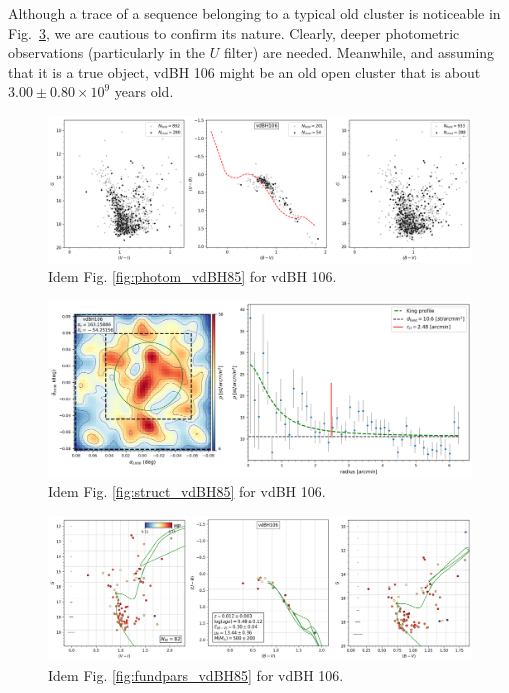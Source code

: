 \documentclass[draft]{aa}
\begin{document}
Although a trace of a sequence belonging to a typical old cluster is
noticeable in Fig.~\ref{fig45}, we are cautious to confirm its nature.
Clearly, deeper photometric observations (particularly in the $U$ filter) are
needed. Meanwhile, and assuming that it is a true object,
vdBH 106 might be an old open cluster that is about $3.00\pm0.80\times10^9$ years
old.

\begin{figure}[ht]
    \centering
    \includegraphics[width=\hsize]{../figs/obs_vdBH106.png}
    \caption{Idem Fig. \ref{fig:photom_vdBH85} for vdBH 106.}
    \label{fig43}
\end{figure}
\begin{figure}[ht]
    \centering
    \includegraphics[width=\hsize]{../figs/dmap_vdbh106.png}
    \caption{Idem Fig. \ref{fig:struct_vdBH85} for vdBH 106.}
    \label{fig44}
\end{figure}
\begin{figure}[ht]
    \centering
    \includegraphics[width=\hsize]{../figs/cmds_vdbh106.png}
    \caption{Idem Fig. \ref{fig:fundpars_vdBH85} for vdBH 106.}
    \label{fig45}
\end{figure}
\end{document}

